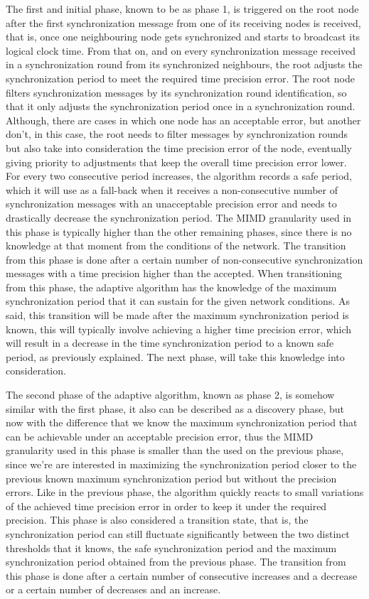 \clearpage

The first and initial phase, known to be as phase 1, is triggered on the root node after the first synchronization message from one of its receiving nodes is received, that is, once one neighbouring node gets synchronized and starts to broadcast its logical clock time. From that on, and on every synchronization message received in a synchronization round from its synchronized neighbours, the root adjusts the synchronization period to meet the required time precision error. The root node filters synchronization messages by its synchronization round identification, so that it only adjusts the synchronization period once in a synchronization round. Although, there are cases in which one node has an acceptable error, but another don't, in this case, the root needs to filter messages by synchronization rounds but also take into consideration the time precision error of the node, eventually giving priority to adjustments that keep the overall time precision error lower. For every two consecutive period increases, the algorithm records a safe period, which it will use as a fall-back when it receives a non-consecutive number of synchronization messages with an unacceptable precision error and needs to drastically decrease the synchronization period. The MIMD granularity used in this phase is typically higher than the other remaining phases, since there is no knowledge at that moment from the conditions of the network. The transition from this phase is done after a certain number of non-consecutive synchronization messages with a time precision higher than the accepted. When transitioning from this phase, the adaptive algorithm has the knowledge of the maximum synchronization period that it can sustain for the given network conditions. As said, this transition will be made after the maximum synchronization period is known, this will typically involve achieving a higher time precision error, which will result in a decrease in the time synchronization period to a known safe period, as previously explained. The next phase, will take this knowledge into consideration.

The second phase of the adaptive algorithm, known as phase 2, is somehow similar with the first phase, it also can be described as a discovery phase, but now with the difference that we know the maximum synchronization period that can be achievable under an acceptable precision error, thus the MIMD granularity used in this phase is smaller than the used on the previous phase, since we're are interested in maximizing the synchronization period closer to the previous known maximum synchronization period but without the precision errors. Like in the previous phase, the algorithm quickly reacts to small variations of the achieved time precision error in order to keep it under the required precision. This phase is also considered a transition state, that is, the synchronization period can still fluctuate significantly between the two distinct thresholds that it knows, the safe synchronization period and the maximum synchronization period obtained from the previous phase. The transition from this phase is done after a certain number of consecutive increases and a decrease or a certain number of decreases and an increase.

